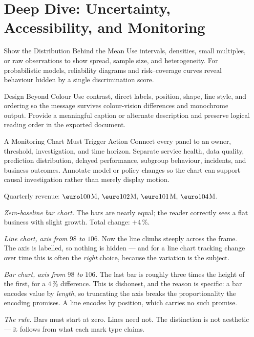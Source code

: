 \section{Deep Dive: Uncertainty, Accessibility, and Monitoring}
\begin{v3topic}{Show the Distribution Behind the Mean}
Use intervals, densities, small multiples, or raw observations to show spread,
sample size, and heterogeneity.
For probabilistic models, reliability diagrams and risk--coverage curves reveal
behaviour hidden by a single discrimination score.

\end{v3topic}
\begin{v3topic}{Design Beyond Colour}
Use contrast, direct labels, position, shape, line style, and ordering so the
message survives colour-vision differences and monochrome output.
Provide a meaningful caption or alternate description and preserve logical
reading order in the exported document.

\end{v3topic}
\begin{v3topic}{A Monitoring Chart Must Trigger Action}
Connect every panel to an owner, threshold, investigation, and time horizon.
Separate service health, data quality, prediction distribution, delayed
performance, subgroup behaviour, incidents, and business outcomes.
Annotate model or policy changes so the chart can support causal investigation
rather than merely display motion.
\end{v3topic}


\begin{workedexample}
Quarterly revenue: $\text{\euro}100$M, $\text{\euro}102$M,
$\text{\euro}101$M, $\text{\euro}104$M.

\emph{Zero-baseline bar chart.} The bars are nearly equal; the reader correctly
sees a flat business with slight growth. Total change: $+4\,\%$.

\emph{Line chart, axis from $98$ to $106$.} Now the line climbs steeply across
the frame. The axis is labelled, so nothing is hidden --- and for a line chart
tracking change over time this is often the \emph{right} choice, because the
variation is the subject.

\emph{Bar chart, axis from $98$ to $106$.} The last bar is roughly three times
the height of the first, for a $4\,\%$ difference. This is dishonest, and the
reason is specific: a bar encodes value by \emph{length}, so truncating the
axis breaks the proportionality the encoding promises. A line encodes by
position, which carries no such promise.

\emph{The rule.} Bars must start at zero. Lines need not. The distinction is
not aesthetic --- it follows from what each mark type claims.
\end{workedexample}

